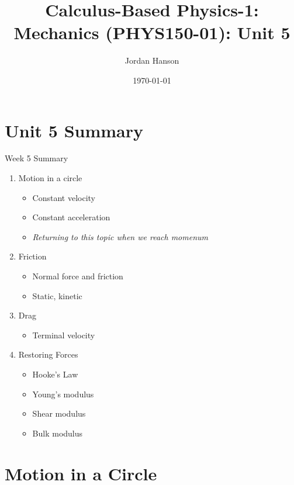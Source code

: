 \documentclass{beamer}
\title{Calculus-Based Physics-1: Mechanics (PHYS150-01): Unit 5}
\date{\today}
\author{Jordan Hanson}
\institute{Whittier College Department of Physics and Astronomy}
\begin{document}
\maketitle

\section{Unit 5 Summary}

\begin{frame}{Week 5 Summary}
\begin{enumerate}
\item \alert{Motion in a circle}
\begin{itemize}
\item Constant velocity
\item Constant acceleration
\item \textit{Returning to this topic when we reach \alert{momenum}}
\end{itemize}
\item \alert{Friction}
\begin{itemize}
\item Normal force and friction
\item Static, kinetic
\end{itemize}
\item \alert{Drag}
\begin{itemize}
\item Terminal velocity
\end{itemize}
\item \alert{Restoring Forces}
\begin{itemize}
\item Hooke's Law
\item Young's modulus
\item Shear modulus
\item Bulk modulus
\end{itemize}
\end{enumerate}
\end{frame}

\section{Motion in a Circle}
\end{document}
